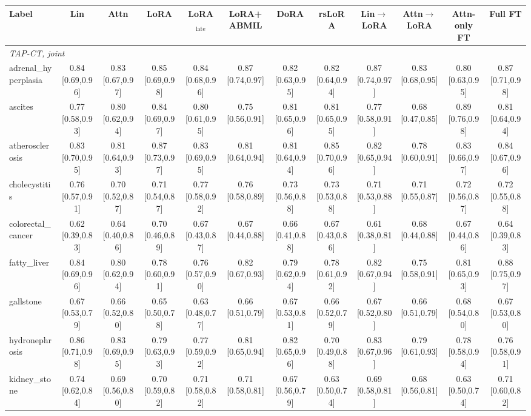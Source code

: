 \begin{tabular}{lccccccccccc}
\toprule
Label & Lin & Attn & LoRA & LoRA$_{\text{late}}$ & LoRA+ABMIL & DoRA & rsLoRA & Lin$\to$LoRA & Attn$\to$LoRA & Attn-only FT & Full FT \\
\midrule
\multicolumn{12}{l}{\textit{TAP-CT, joint}} \\
adrenal\_hyperplasia & 0.84 [0.69,0.96] & 0.83 [0.67,0.97] & 0.85 [0.69,0.98] & 0.84 [0.68,0.96] & 0.87 [0.74,0.97] & 0.82 [0.63,0.95] & 0.82 [0.64,0.94] & 0.87 [0.74,0.97] & 0.83 [0.68,0.95] & 0.80 [0.63,0.95] & 0.87 [0.71,0.98] \\
ascites & 0.77 [0.58,0.93] & 0.80 [0.62,0.94] & 0.84 [0.69,0.97] & 0.80 [0.61,0.95] & 0.75 [0.56,0.91] & 0.81 [0.65,0.96] & 0.81 [0.65,0.95] & 0.77 [0.58,0.91] & 0.68 [0.47,0.85] & 0.89 [0.76,0.98] & 0.81 [0.64,0.94] \\
atherosclerosis & 0.83 [0.70,0.95] & 0.81 [0.64,0.93] & 0.87 [0.73,0.97] & 0.83 [0.69,0.95] & 0.81 [0.64,0.94] & 0.81 [0.64,0.94] & 0.85 [0.70,0.96] & 0.82 [0.65,0.94] & 0.78 [0.60,0.91] & 0.83 [0.66,0.97] & 0.84 [0.67,0.96] \\
cholecystitis & 0.76 [0.57,0.91] & 0.70 [0.52,0.87] & 0.71 [0.54,0.87] & 0.77 [0.58,0.92] & 0.76 [0.58,0.89] & 0.73 [0.56,0.88] & 0.73 [0.53,0.88] & 0.71 [0.53,0.88] & 0.71 [0.55,0.87] & 0.72 [0.56,0.87] & 0.72 [0.55,0.88] \\
colorectal\_cancer & 0.62 [0.39,0.83] & 0.64 [0.40,0.86] & 0.70 [0.46,0.89] & 0.67 [0.43,0.87] & 0.67 [0.44,0.88] & 0.66 [0.41,0.88] & 0.67 [0.43,0.86] & 0.61 [0.38,0.81] & 0.68 [0.44,0.88] & 0.67 [0.44,0.86] & 0.64 [0.39,0.83] \\
fatty\_liver & 0.84 [0.69,0.96] & 0.80 [0.62,0.94] & 0.78 [0.60,0.91] & 0.76 [0.57,0.90] & 0.82 [0.67,0.93] & 0.79 [0.62,0.94] & 0.78 [0.61,0.92] & 0.82 [0.67,0.94] & 0.75 [0.58,0.91] & 0.81 [0.65,0.93] & 0.88 [0.75,0.97] \\
gallstone & 0.67 [0.53,0.79] & 0.66 [0.52,0.80] & 0.65 [0.50,0.78] & 0.63 [0.48,0.77] & 0.66 [0.51,0.79] & 0.67 [0.53,0.81] & 0.66 [0.52,0.79] & 0.67 [0.52,0.80] & 0.66 [0.51,0.79] & 0.68 [0.54,0.80] & 0.67 [0.53,0.80] \\
hydronephrosis & 0.86 [0.71,0.98] & 0.83 [0.69,0.95] & 0.79 [0.63,0.93] & 0.77 [0.59,0.92] & 0.81 [0.65,0.94] & 0.82 [0.65,0.96] & 0.70 [0.49,0.88] & 0.83 [0.67,0.96] & 0.79 [0.61,0.93] & 0.78 [0.58,0.94] & 0.76 [0.58,0.91] \\
kidney\_stone & 0.74 [0.62,0.84] & 0.69 [0.56,0.80] & 0.70 [0.59,0.82] & 0.71 [0.58,0.82] & 0.71 [0.58,0.81] & 0.67 [0.56,0.79] & 0.63 [0.50,0.74] & 0.69 [0.58,0.81] & 0.68 [0.56,0.81] & 0.63 [0.50,0.74] & 0.71 [0.60,0.82] \\

\end{tabular}
